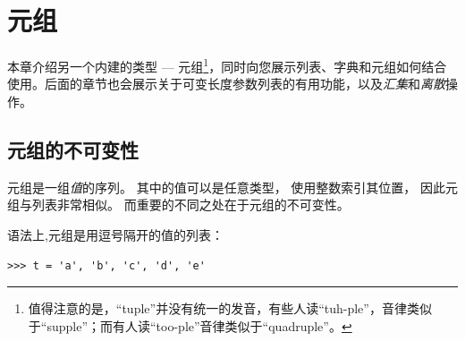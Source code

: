 

\chapter{元组}
\label{tuplechap}


本章介绍另一个内建的类型 --- 元组\footnote{值得注意的是，``tuple''并没有统一的发音，有些人读``tuh-ple''，音律类似于``supple''；而有人读``too-ple''音律类似于``quadruple''。}，同时向您展示列表、字典和元组如何结合使用。后面的章节也会展示关于可变长度参数列表的有用功能，以及\emph{汇集}和\emph{离散}操作。

\section{元组的不可变性}
    

  

元组是一组\emph{值}的序列。
其中的值可以是任意类型， 使用整数索引其位置， 因此元组与列表非常相似。 而重要的不同之处在于元组的不可变性。


语法上,元组是用逗号隔开的值的列表：

\begin{lstlisting}
>>> t = 'a', 'b', 'c', 'd', 'e'
\end{lstlisting}
%

